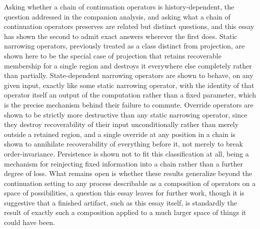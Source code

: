 \documentclass[11pt]{article}
\begin{document}
Asking whether a chain of continuation operators is history-dependent, the question addressed in the companion analysis, and asking what a chain of continuation operators preserves are related but distinct questions, and this essay has shown the second to admit exact answers wherever the first does. Static narrowing operators, previously treated as a class distinct from projection, are shown here to be the special case of projection that retains recoverable membership for a single region and destroys it everywhere else completely rather than partially. State-dependent narrowing operators are shown to behave, on any given input, exactly like some static narrowing operator, with the identity of that operator itself an output of the computation rather than a fixed parameter, which is the precise mechanism behind their failure to commute. Override operators are shown to be strictly more destructive than any static narrowing operator, since they destroy recoverability of their input unconditionally rather than merely outside a retained region, and a single override at any position in a chain is shown to annihilate recoverability of everything before it, not merely to break order-invariance. Persistence is shown not to fit this classification at all, being a mechanism for reinjecting fixed information into a chain rather than a further degree of loss. What remains open is whether these results generalize beyond the continuation setting to any process describable as a composition of operators on a space of possibilities, a question this essay leaves for further work, though it is suggestive that a finished artifact, such as this essay itself, is standardly the result of exactly such a composition applied to a much larger space of things it could have been.
\end{document}

